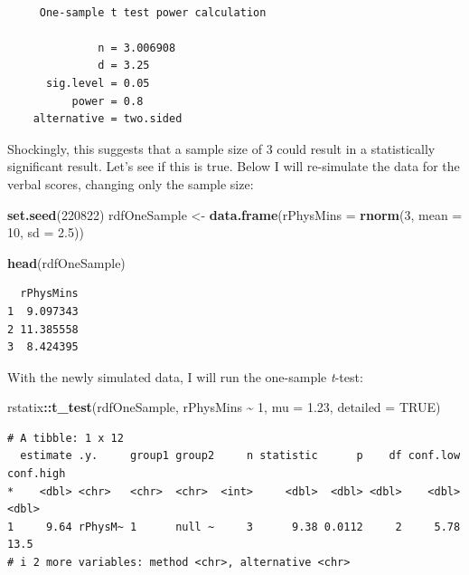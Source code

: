 \documentclass[
  11pt,
]{book}
\newenvironment{Shaded}{\begin{snugshade}}{\end{snugshade}}
\newcommand{\AttributeTok}[1]{\textcolor[rgb]{0.27,0.27,0.27}{#1}}
\newcommand{\ConstantTok}[1]{\textcolor[rgb]{0.37,0.37,0.37}{#1}}
\newcommand{\DecValTok}[1]{\textcolor[rgb]{0.06,0.06,0.06}{#1}}
\newcommand{\FloatTok}[1]{\textcolor[rgb]{0.06,0.06,0.06}{#1}}
\newcommand{\FunctionTok}[1]{\textcolor[rgb]{0.27,0.27,0.27}{\textbf{#1}}}
\newcommand{\NormalTok}[1]{#1}
\newcommand{\OtherTok}[1]{\textcolor[rgb]{0.37,0.37,0.37}{#1}}
\newcommand{\SpecialCharTok}[1]{\textcolor[rgb]{0.43,0.43,0.43}{\textbf{#1}}}
\begin{document}
\begin{verbatim}

     One-sample t test power calculation 

              n = 3.006908
              d = 3.25
      sig.level = 0.05
          power = 0.8
    alternative = two.sided
\end{verbatim}

Shockingly, this suggests that a sample size of 3 could result in a statistically significant result. Let's see if this is true. Below I will re-simulate the data for the verbal scores, changing only the sample size:

\begin{Shaded}
\begin{Highlighting}[]
\FunctionTok{set.seed}\NormalTok{(}\DecValTok{220822}\NormalTok{)}
\NormalTok{rdfOneSample }\OtherTok{\textless{}{-}} \FunctionTok{data.frame}\NormalTok{(}\AttributeTok{rPhysMins =} \FunctionTok{rnorm}\NormalTok{(}\DecValTok{3}\NormalTok{, }\AttributeTok{mean =} \DecValTok{10}\NormalTok{, }\AttributeTok{sd =} \FloatTok{2.5}\NormalTok{))}

\FunctionTok{head}\NormalTok{(rdfOneSample)}
\end{Highlighting}
\end{Shaded}

\begin{verbatim}
  rPhysMins
1  9.097343
2 11.385558
3  8.424395
\end{verbatim}

With the newly simulated data, I will run the one-sample \emph{t}-test:

\begin{Shaded}
\begin{Highlighting}[]
\NormalTok{rstatix}\SpecialCharTok{::}\FunctionTok{t\_test}\NormalTok{(rdfOneSample, rPhysMins }\SpecialCharTok{\textasciitilde{}} \DecValTok{1}\NormalTok{, }\AttributeTok{mu =} \FloatTok{1.23}\NormalTok{, }\AttributeTok{detailed =} \ConstantTok{TRUE}\NormalTok{)}
\end{Highlighting}
\end{Shaded}

\begin{verbatim}
# A tibble: 1 x 12
  estimate .y.     group1 group2     n statistic      p    df conf.low conf.high
*    <dbl> <chr>   <chr>  <chr>  <int>     <dbl>  <dbl> <dbl>    <dbl>     <dbl>
1     9.64 rPhysM~ 1      null ~     3      9.38 0.0112     2     5.78      13.5
# i 2 more variables: method <chr>, alternative <chr>
\end{verbatim}
\end{document}
